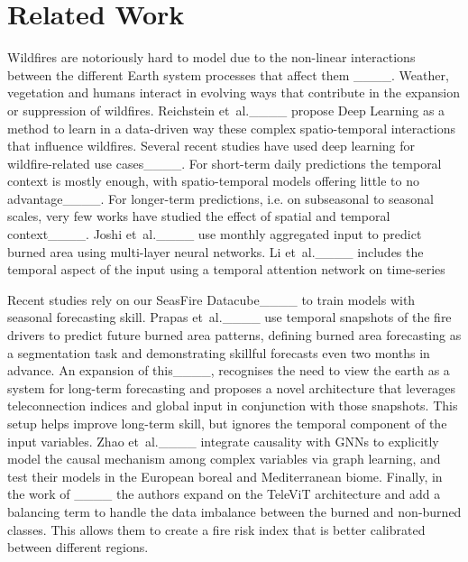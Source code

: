 \section{Related Work}
Wildfires are notoriously hard to model due to the non-linear interactions between the different Earth system processes
that affect them ____. Weather, vegetation and humans interact in evolving ways that contribute in the
expansion or suppression of wildfires. Reichstein et~al.____ propose Deep Learning as a method to learn
in a  data-driven way these complex spatio-temporal interactions that influence wildfires. Several recent studies have used deep
learning for wildfire-related use cases____. For short-term daily predictions the temporal context is mostly
enough, with spatio-temporal models offering little to no advantage____. For longer-term
predictions, i.e. on subseasonal to seasonal scales, very few works have studied the effect of spatial and temporal
context____.
Joshi et~al.____ use monthly aggregated input to predict burned area using multi-layer neural networks.
Li et~al.____ includes the temporal aspect of the input using a temporal attention network on time-series

Recent studies rely on our SeasFire Datacube____ to train models with seasonal forecasting skill.
Prapas et~al.____ use temporal snapshots of the fire drivers to predict future burned area patterns,
defining burned area forecasting as a segmentation task and demonstrating skillful forecasts even two months in advance. An
expansion of this____, recognises the need to view the earth as a system for long-term forecasting and proposes a novel architecture that leverages teleconnection indices and global input in conjunction with those snapshots. This setup helps improve long-term skill, but ignores the temporal component of the input variables. 
Zhao et~al.____ integrate causality with GNNs to explicitly model the causal mechanism among complex
variables via graph learning, and test their models in the European boreal and Mediterranean biome.
Finally, in the work of ____ the authors expand on the TeleViT architecture and add a balancing term to handle the data imbalance between the burned and non-burned classes. This allows them to create a fire risk index that is better calibrated between different regions. 

